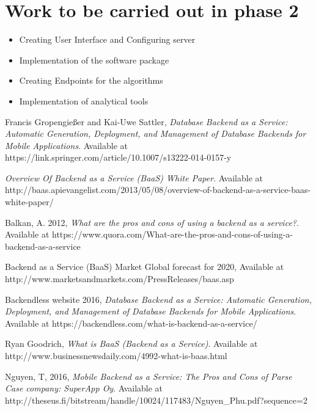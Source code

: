 \documentclass[a4paper,12pt]{report}
\begin{document}
    \section{Work to be carried out in phase 2}
    \begin{itemize}
      \item  Creating User Interface and Configuring server
      \item  Implementation of the software package
      \item  Creating Endpoints for the algorithms
      \item  Implementation of analytical tools 
    \end{itemize}    
    
    \renewcommand{\bibname}{References}
    \begin{thebibliography}{9}
    	Francis Gropengießer and Kai-Uwe Sattler,
      \emph{Database Backend as a Service: Automatic Generation, Deployment, and Management of Database Backends for Mobile Applications}.
			Available at https://link.springer.com/article/10.1007/s13222-014-0157-y
			
      \emph{Overview Of Backend as a Service (BaaS) White Paper}.
			Available at http://baas.apievangelist.com/2013/05/08/overview-of-backend-as-a-service-baas-white-paper/
			
								
			Balkan, A. 2012,
      \emph{What are the pros and cons of using a backend as a service?}.
			Available at https://www.quora.com/What-are-the-pros-and-cons-of-using-a-backend-as-a-service
		
			Backend as a Service (BaaS) Market Global forecast for 2020,
			Available at http://www.marketsandmarkets.com/PressReleases/baas.asp		
		
			Backendless website 2016,
      \emph{Database Backend as a Service: Automatic Generation, Deployment, and Management of Database Backends for Mobile Applications}.
			Available at https://backendless.com/what-is-backend-as-a-service/
	

			Ryan Goodrich,
      \emph{What is BaaS (Backend as a Service)}.
			Available at http://www.businessnewsdaily.com/4992-what-is-baas.html	
			
			Nguyen, T, 2016,
      \emph{Mobile Backend as a Service: The Pros and Cons of Parse
			Case company: SuperApp Oy}.
			Available at http://theseus.fi/bitstream/handle/10024/117483/Nguyen{\_}Phu.pdf?sequence=2
		
		\end{thebibliography}	
    
\end{document}

